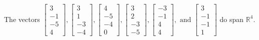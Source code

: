 \begin{exercise}
\begin{exerciseStatement}
  \end{exerciseStatement}
  \begin{exerciseAnswer}
   The vectors \(\left[\begin{array}{r}
3 \\
-1 \\
-5 \\
4
\end{array}\right] , \left[\begin{array}{r}
3 \\
1 \\
-3 \\
-4
\end{array}\right] , \left[\begin{array}{r}
4 \\
-5 \\
-4 \\
0
\end{array}\right] , \left[\begin{array}{r}
3 \\
2 \\
-3 \\
-5
\end{array}\right] , \left[\begin{array}{r}
-3 \\
-1 \\
4 \\
4
\end{array}\right] , \text{ and } \left[\begin{array}{r}
3 \\
-1 \\
-1 \\
1
\end{array}\right]\) 
  	 do  
	span \(\mathbb{R}^4\).
  


  \end{exerciseAnswer}
\end{exercise}